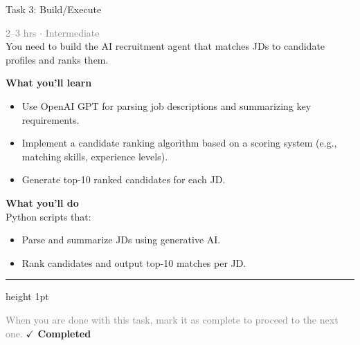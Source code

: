 \documentclass[10pt,a4paper]{article}
\begin{document}
\begin{taskbox}{Task 3: Build/Execute}

    {\small \textcolor{gray}{2--3 hrs $\cdot$ Intermediate}}\\[12pt]

     You need to build the AI recruitment agent that matches JDs to candidate profiles and ranks them.  


\vspace{8pt}
{\large \textbf{\textcolor{brandLight}{What you'll learn}}}\\[4pt]  
\begin{itemize}
    \item Use OpenAI GPT for parsing job descriptions and summarizing key requirements.  
    \item Implement a candidate ranking algorithm based on a scoring system (e.g., matching skills, experience levels).  
    \item Generate top-10 ranked candidates for each JD.  
\end{itemize}

\vspace{8pt}
{\large \textbf{\textcolor{brandLight}{What you'll do}}}\\[4pt]  
Python scripts that:  
\begin{itemize}
    \item Parse and summarize JDs using generative AI.  
    \item Rank candidates and output top-10 matches per JD.\par
\end{itemize}

    \vspace{16pt}

    \textcolor{cardBorder}{\hrule height 1pt}\vspace{8pt}

    \small \textcolor{gray}{When you are done with this task, mark it as complete to proceed to the next one.} \hfill \textbf{\textcolor{brandDark}{$\checkmark$ Completed}}

\end{taskbox}
\end{document}

